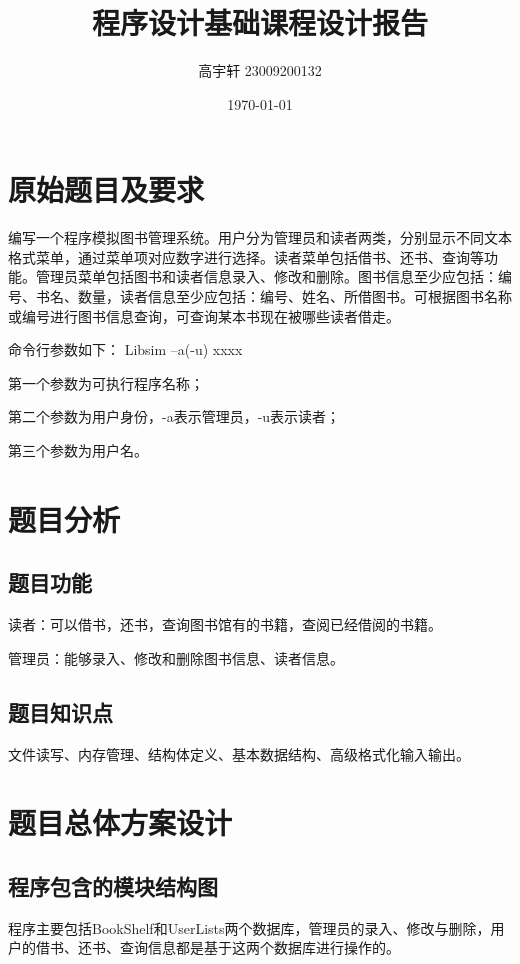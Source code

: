 \documentclass{ctexart}
\title{\vspace{-2cm}\textbf{程序设计基础课程设计报告} \\ \fontsize{12}{14}{---模拟图书馆管理系统}}
\author{高宇轩 23009200132}
\date{\today}
\begin{document}
    
    \maketitle
    
    \section{原始题目及要求}
    编写一个程序模拟图书管理系统。用户分为管理员和读者两类，分别显示不同文本格式菜单，通过菜单项对应数字进行选择。读者菜单包括借书、还书、查询等功能。管理员菜单包括图书和读者信息录入、修改和删除。图书信息至少应包括：编号、书名、数量，读者信息至少应包括：编号、姓名、所借图书。可根据图书名称或编号进行图书信息查询，可查询某本书现在被哪些读者借走。
    
    命令行参数如下：
    Libsim –a(-u) xxxx
    
    第一个参数为可执行程序名称；
    
    第二个参数为用户身份，-a表示管理员，-u表示读者；
    
    第三个参数为用户名。

    
    \section{题目分析}
    
    \subsection{题目功能}
    读者：可以借书，还书，查询图书馆有的书籍，查阅已经借阅的书籍。
    
    管理员：能够录入、修改和删除图书信息、读者信息。
    
    \subsection{题目知识点}
    文件读写、内存管理、结构体定义、基本数据结构、高级格式化输入输出。
    
    \section{题目总体方案设计}
    
    \subsection{程序包含的模块结构图}
    程序主要包括BookShelf和UserLists两个数据库，管理员的录入、修改与删除，用户的借书、还书、查询信息都是基于这两个数据库进行操作的。
    
\end{document}
